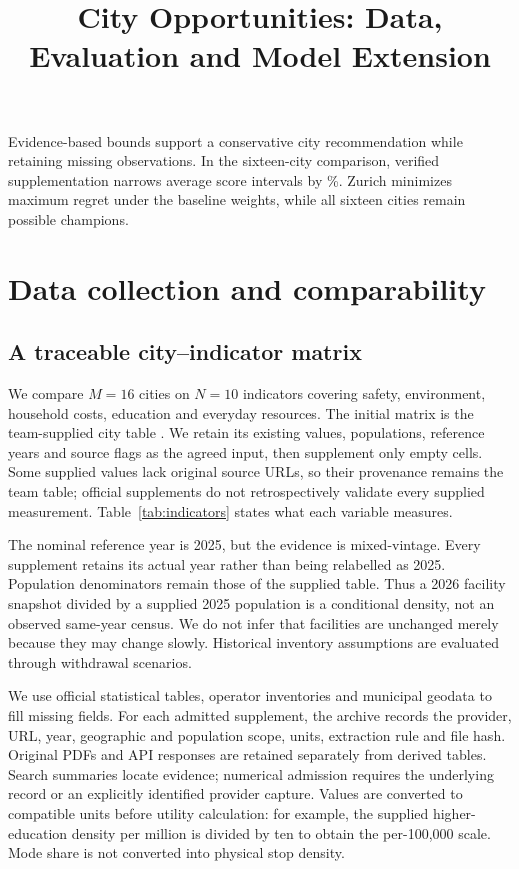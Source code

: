 \documentclass[12pt]{article}
\title{City Opportunities: Data, Evaluation and Model Extension}
\author{}
\date{}
\begin{document}
\maketitle
\noindent Evidence-based bounds support a conservative city recommendation while
retaining missing observations. In the sixteen-city comparison, verified
supplementation narrows average score intervals by \TotalWidthReduction\%.
Zurich minimizes maximum regret under the baseline weights, while all sixteen
cities remain possible champions.

\setcounter{section}{3}
\section{Data collection and comparability}
\subsection{A traceable city--indicator matrix}
We compare $M=16$ cities on $N=10$ indicators covering safety, environment,
household costs, education and everyday resources. The initial matrix is the
team-supplied city table \cite{teamtable}. We retain its existing values, populations, reference
years and source flags as the agreed input, then supplement only empty cells.
Some supplied values lack original source URLs, so their provenance remains
the team table; official supplements do not retrospectively validate every
supplied measurement. Table~\ref{tab:indicators} states what each variable measures.



The nominal reference year is 2025, but the evidence is mixed-vintage. Every
supplement retains its actual year rather than being relabelled as 2025.
Population denominators remain those of the supplied table. Thus a 2026 facility
snapshot divided by a supplied 2025 population is a conditional density, not an
observed same-year census. We do not infer that facilities are unchanged merely
because they may change slowly. Historical inventory assumptions are evaluated
through withdrawal scenarios.

We use official statistical tables, operator inventories and municipal geodata
to fill missing fields. For each admitted supplement, the archive records the
provider, URL, year, geographic and population scope, units, extraction rule and
file hash. Original PDFs and API responses are retained separately from derived
tables. Search summaries locate evidence; numerical admission requires the
underlying record or an explicitly identified provider capture. Values are
converted to compatible units before utility calculation: for example, the
supplied higher-education density per million is divided by ten to obtain the
per-100,000 scale. Mode share is not converted into physical stop density.
\end{document}
